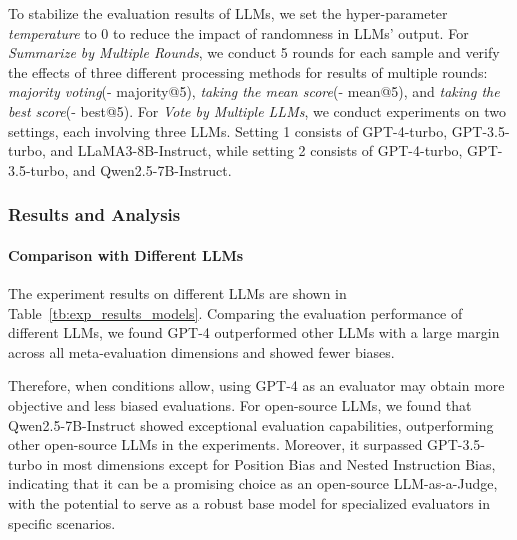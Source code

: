 To stabilize the evaluation results of LLMs, we set the hyper-parameter \textit{temperature} to 0 to reduce the impact of randomness in LLMs' output. For \textit{Summarize by Multiple Rounds}, we conduct 5 rounds for each sample and verify the effects of three different processing methods for results of multiple rounds: \textit{majority voting}(- majority@5), \textit{taking the mean score}(- mean@5), and \textit{taking the best score}(- best@5). For \textit{Vote by Multiple LLMs}, we conduct experiments on two settings, each involving three LLMs. Setting 1 consists of GPT-4-turbo, GPT-3.5-turbo, and LLaMA3-8B-Instruct, while setting 2 consists of GPT-4-turbo, GPT-3.5-turbo, and Qwen2.5-7B-Instruct.



\subsubsection{\textbf{Results and Analysis}}
\label{subsec:exp_results}
\paragraph{\textbf{Comparison with Different LLMs}}
The experiment results on different LLMs are shown in Table~\ref{tb:exp_results_models}. 
Comparing the evaluation performance of different LLMs, we found GPT-4 outperformed other LLMs with a large margin across all meta-evaluation dimensions and showed fewer biases. 




% 

Therefore, when conditions allow, using GPT-4 as an evaluator may obtain more objective and less biased evaluations. 
For open-source LLMs, we found that Qwen2.5-7B-Instruct showed exceptional evaluation capabilities, outperforming other open-source LLMs in the experiments. 
Moreover, it surpassed GPT-3.5-turbo in most dimensions except for Position Bias and Nested Instruction Bias, indicating that it can be a promising choice as an open-source LLM-as-a-Judge, with the potential to serve as a robust base model for specialized evaluators in specific scenarios.

